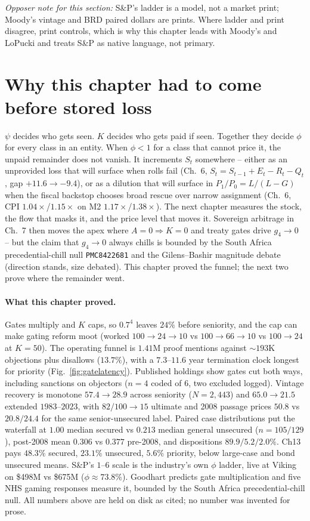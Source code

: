 \textit{Opposer note for this section:} S\&P's ladder is a model, not a market print; Moody's vintage and BRD paired dollars are prints. Where ladder and print disagree, print controls, which is why this chapter leads with Moody's and LoPucki and treats S\&P as native language, not primary.

\section{Why this chapter had to come before stored loss}
\label{sec:bridge}

$\psi$ decides who gets seen. $K$ decides who gets paid if seen. Together they decide $\phi$ for every class in an entity. When $\phi<1$ for a class that cannot price it, the unpaid remainder does not vanish. It increments $S_t$ somewhere -- either as an unprovided loss that will surface when rolls fail (Ch.~6, $S_t=S_{t-1}+E_t-R_t-Q_t$, gap $+11.6\to-9.4$), or as a dilution that will surface in $P_1/P_0=L/(L-G)$ when the fiscal backstop chooses broad rescue over narrow assignment (Ch.~6, CPI $1.04\times$/$1.15\times$ on M2 $1.17\times$/$1.38\times$). The next chapter measures the stock, the flow that masks it, and the price level that moves it. Sovereign arbitrage in Ch.~7 then moves the apex where $A=0\Rightarrow K=0$ and treaty gates drive $g_4\to0$ -- but the claim that $g_4\to0$ always chills is bounded by the South Africa precedential-chill null \texttt{PMC8422681} and the Gilens--Bashir magnitude debate (direction stands, size debated). This chapter proved the funnel; the next two prove where the remainder went.

\paragraph{What this chapter proved.} Gates multiply and $K$ caps, so $0.7^4$ leaves $24\%$ before seniority, and the cap can make gating reform moot (worked $100\to24\to10$ vs $100\to66\to10$ vs $100\to24$ at $K=50$). The operating funnel is $1.41$M proof mentions against $\sim193$K objections plus disallows ($13.7\%$), with a $7.3$--$11.6$ year termination clock longest for priority (Fig.~\ref{fig:gatelatency}). Published holdings show gates cut both ways, including sanctions on objectors ($n=4$ coded of $6$, two excluded logged). Vintage recovery is monotone $57.4\to28.9$ across seniority ($N=2{,}443$) and $65.0\to21.5$ extended $1983$--$2023$, with $82/100\to15$ ultimate and 2008 passage prices $50.8$ vs $20.8/24.4$ for the same senior-unsecured label. Paired case distributions put the waterfall at $1.00$ median secured vs $0.213$ median general unsecured ($n=105/129$), post-2008 mean $0.306$ vs $0.377$ pre-2008, and dispositions $89.9/5.2/2.0\%$. Ch13 pays $48.3\%$ secured, $23.1\%$ unsecured, $5.6\%$ priority, below large-case and bond unsecured means. S\&P's $1$--$6$ scale is the industry's own $\phi$ ladder, live at Viking on \$498M vs \$675M ($\phi\approx73.8\%$). Goodhart predicts gate multiplication and five NHS gaming responses measure it, bounded by the South Africa precedential-chill null. All numbers above are held on disk as cited; no number was invented for prose.

